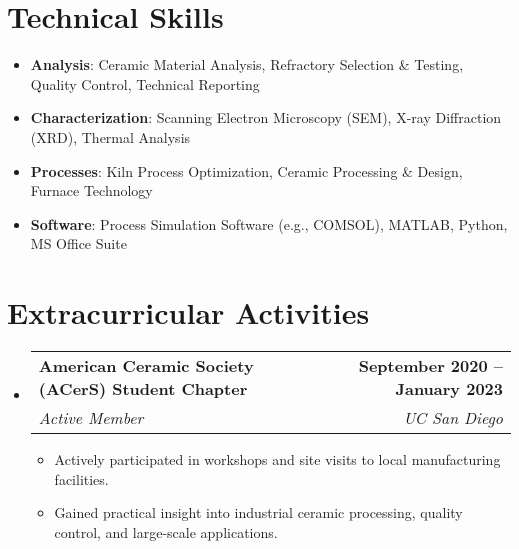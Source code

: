 \documentclass[letterpaper,11pt]{article}
\makeatletter
\newcommand{\resumeItem}[1]{
  \item\small{
    {#1 \vspace{-2pt}}
  }
}
\newcommand{\resumeSubheading}[4]{
  \vspace{-2pt}\item
    \begin{tabular*}{1.0\textwidth}[t]{l@{\extracolsep{\fill}}r}
      \textbf{#1} & \textbf{\small #2} \\
      \textit{\small#3} & \textit{\small #4} \\
    \end{tabular*}\vspace{-7pt}
}
\newcommand{\resumeSubHeadingListStart}{\begin{itemize}[leftmargin=0.0in, label={}]}
\newcommand{\resumeSubHeadingListEnd}{\end{itemize}}
\newcommand{\resumeItemListStart}{\begin{itemize}}
\newcommand{\resumeItemListEnd}{\end{itemize}\vspace{-5pt}}
\makeatother
\begin{document}
\vspace{-16pt}

\section{Technical Skills}
 \begin{itemize}[leftmargin=0.35in, itemsep=0pt, label={\tiny$\bullet$}]
     \item \textbf{Analysis}{: Ceramic Material Analysis, Refractory Selection \& Testing, Quality Control, Technical Reporting}
     \item \textbf{Characterization}{: Scanning Electron Microscopy (SEM), X-ray Diffraction (XRD), Thermal Analysis}
     \item \textbf{Processes}{: Kiln Process Optimization, Ceramic Processing \& Design, Furnace Technology}
     \item \textbf{Software}{: Process Simulation Software (e.g., COMSOL), MATLAB, Python, MS Office Suite}
 \end{itemize}
 \vspace{-16pt}

\section{Extracurricular Activities}
    \resumeSubHeadingListStart
        \resumeSubheading{American Ceramic Society (ACerS) Student Chapter}{September 2020 -- January 2023}{Active Member}{UC San Diego}
            \resumeItemListStart
                \resumeItem{Actively participated in workshops and site visits to local manufacturing facilities.}
                \resumeItem{Gained practical insight into industrial ceramic processing, quality control, and large-scale applications.}
            \resumeItemListEnd
    \resumeSubHeadingListEnd
\end{document}
